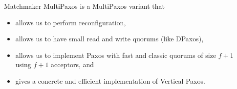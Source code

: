 Matchmaker MultiPaxos is a MultiPaxos variant that

\begin{itemize}
  \item
    allows us to perform reconfiguration,

  \item
    allows us to have small read and write quorums (like DPaxos),

  \item
    allows us to implement Paxos with fast and classic quorums of size $f+1$
    using $f+1$ acceptors, and

  \item
    gives a concrete and efficient implementation of Vertical Paxos.
\end{itemize}
